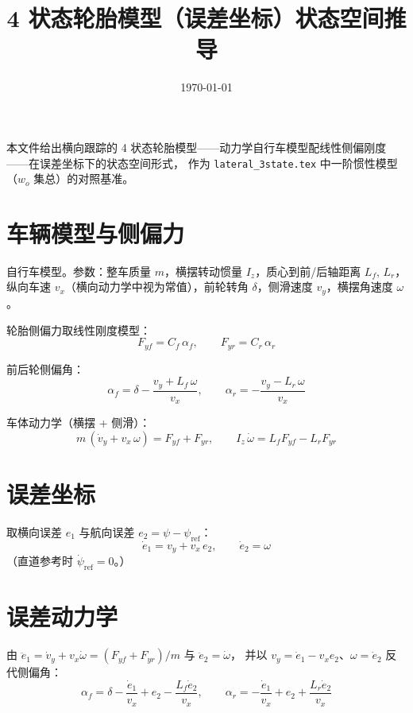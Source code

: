 \documentclass[11pt,a4paper]{article}
\title{4 状态轮胎模型（误差坐标）状态空间推导}
\author{}
\date{\today}
\begin{document}
\maketitle

本文件给出横向跟踪的 4 状态轮胎模型——动力学自行车模型配线性侧偏刚度——在误差坐标下的状态空间形式，
作为 \texttt{lateral\_3state.tex} 中一阶惯性模型（$w_o$ 集总）的对照基准。

\section{车辆模型与侧偏力}

自行车模型。参数：整车质量 $m$，横摆转动惯量 $I_z$，质心到前/后轴距离 $L_f,\,L_r$，
纵向车速 $v_x$（横向动力学中视为常值），前轮转角 $\delta$，侧滑速度 $v_y$，横摆角速度 $\omega$。

轮胎侧偏力取线性刚度模型：
\begin{equation}
F_{yf} = C_f\,\alpha_f, \qquad F_{yr} = C_r\,\alpha_r
\end{equation}

前后轮侧偏角：
\begin{equation}
\alpha_f = \delta - \frac{v_y + L_f\,\omega}{v_x},
\qquad
\alpha_r = -\frac{v_y - L_r\,\omega}{v_x}
\end{equation}

车体动力学（横摆 + 侧滑）：
\begin{equation}
m\,(\dot v_y + v_x\,\omega) = F_{yf} + F_{yr},
\qquad
I_z\,\dot\omega = L_f F_{yf} - L_r F_{yr}
\end{equation}

\section{误差坐标}

取横向误差 $e_1$ 与航向误差 $e_2 = \psi - \psi_{\text{ref}}$：
\begin{equation}
\dot e_1 = v_y + v_x\,e_2,
\qquad
\dot e_2 = \omega
\end{equation}
（直道参考时 $\dot\psi_{\text{ref}} = 0$。）

\section{误差动力学}

由 $\ddot e_1 = \dot v_y + v_x \dot\omega = (F_{yf}+F_{yr})/m$ 与 $\ddot e_2 = \dot\omega$，
并以 $v_y = \dot e_1 - v_x e_2$、$\omega = \dot e_2$ 反代侧偏角：
\begin{equation}
\alpha_f = \delta - \frac{\dot e_1}{v_x} + e_2 - \frac{L_f \dot e_2}{v_x},
\qquad
\alpha_r = -\frac{\dot e_1}{v_x} + e_2 + \frac{L_r \dot e_2}{v_x}
\end{equation}
\end{document}
